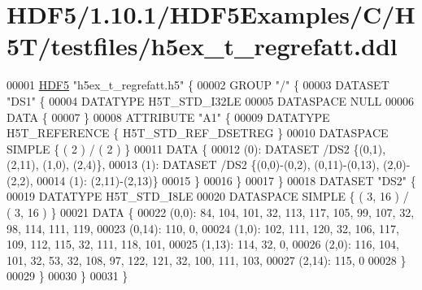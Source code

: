 \hypertarget{_h_d_f5_21_810_81_2_h_d_f5_examples_2_c_2_h5_t_2testfiles_2h5ex__t__regrefatt_8ddl_source}{}\section{H\+D\+F5/1.10.1/\+H\+D\+F5\+Examples/\+C/\+H5\+T/testfiles/h5ex\+\_\+t\+\_\+regrefatt.ddl}
\label{_h_d_f5_21_810_81_2_h_d_f5_examples_2_c_2_h5_t_2testfiles_2h5ex__t__regrefatt_8ddl_source}

\begin{DoxyCode}
00001 \hyperlink{namespace_h_d_f5}{HDF5} \textcolor{stringliteral}{"h5ex\_t\_regrefatt.h5"} \{
00002 GROUP \textcolor{stringliteral}{"/"} \{
00003    DATASET \textcolor{stringliteral}{"DS1"} \{
00004       DATATYPE  H5T\_STD\_I32LE
00005       DATASPACE  NULL
00006       DATA \{
00007       \}
00008       ATTRIBUTE \textcolor{stringliteral}{"A1"} \{
00009          DATATYPE  H5T\_REFERENCE \{ H5T\_STD\_REF\_DSETREG \}
00010          DATASPACE  SIMPLE \{ ( 2 ) / ( 2 ) \}
00011          DATA \{
00012          (0): DATASET /DS2 \{(0,1), (2,11), (1,0), (2,4)\},
00013          (1): DATASET /DS2 \{(0,0)-(0,2), (0,11)-(0,13), (2,0)-(2,2),
00014          (1):  (2,11)-(2,13)\}
00015          \}
00016       \}
00017    \}
00018    DATASET \textcolor{stringliteral}{"DS2"} \{
00019       DATATYPE  H5T\_STD\_I8LE
00020       DATASPACE  SIMPLE \{ ( 3, 16 ) / ( 3, 16 ) \}
00021       DATA \{
00022       (0,0): 84, 104, 101, 32, 113, 117, 105, 99, 107, 32, 98, 114, 111, 119,
00023       (0,14): 110, 0,
00024       (1,0): 102, 111, 120, 32, 106, 117, 109, 112, 115, 32, 111, 118, 101,
00025       (1,13): 114, 32, 0,
00026       (2,0): 116, 104, 101, 32, 53, 32, 108, 97, 122, 121, 32, 100, 111, 103,
00027       (2,14): 115, 0
00028       \}
00029    \}
00030 \}
00031 \}
\end{DoxyCode}
